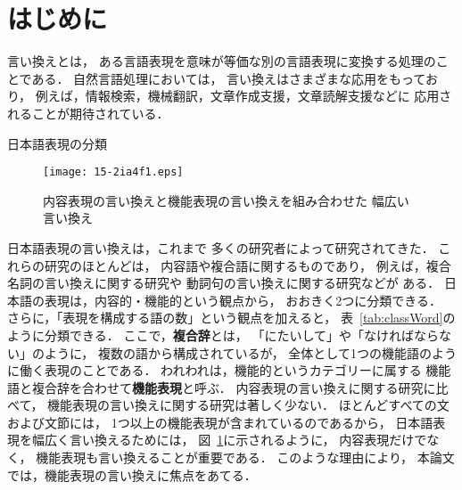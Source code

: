 \documentclass[japanese]{jnlp_1.4}
\begin{document}
\maketitle


\section{はじめに}
\label{sec:intro}

言い換えとは，
ある言語表現を意味が等価な別の言語表現に変換する処理のことである．
自然言語処理においては，
言い換えはさまざまな応用をもっており，
例えば，情報検索，機械翻訳，文章作成支援，文章読解支援などに
応用されることが期待されている．

\begin{table}[b]
\caption{日本語表現の分類}
\label{tab:classWord}

\end{table}
\begin{figure}[b]
\begin{center}
\texttt{[image: 15-2ia4f1.eps]}
\caption{内容表現の言い換えと機能表現の言い換えを組み合わせた
幅広い言い換え}
\label{fig:phrasal}
\end{center}
\end{figure}

日本語表現の言い換えは，これまで
多くの研究者によって研究されてきた．
これらの研究のほとんどは，
内容語や複合語に関するものであり，
例えば，複合名詞の言い換えに関する研究や
動詞句の言い換えに関する研究などが
ある．
日本語の表現は，内容的・機能的という観点から，
おおきく2つに分類できる．
さらに，「表現を構成する語の数」という観点を加えると，
表~\ref{tab:classWord}のように分類できる．
ここで，{\bf 複合辞}とは，
「にたいして」や「なければならない」のように，
複数の語から構成されているが，
全体として1つの機能語のように働く表現のことである．
われわれは，機能的というカテゴリーに属する
機能語と複合辞を合わせて{\bf 機能表現}と呼ぶ．
内容表現の言い換えに関する研究に比べて，
機能表現の言い換えに関する研究は著しく少ない．
ほとんどすべての文および文節には，
1つ以上の機能表現が含まれているのであるから，
日本語表現を幅広く言い換えるためには，
図~\ref{fig:phrasal}に示されるように，
内容表現だけでなく，
機能表現も言い換えることが重要である．
このような理由により，
本論文では，機能表現の言い換えに焦点をあてる．
\end{document}
